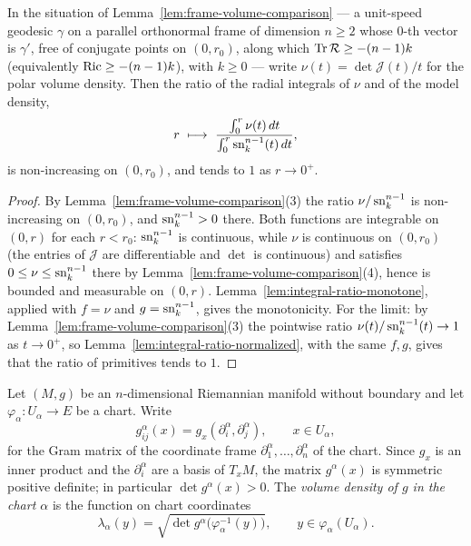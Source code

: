 \begin{lemma}
\label{lem:frame-bishop-gromov}





In the situation of Lemma~\ref{lem:frame-volume-comparison} --- a unit-speed
geodesic $\gamma$ on a parallel orthonormal frame of dimension $n\ge2$ whose
$0$-th vector is $\gamma'$, free of conjugate points on $(0,r_0)$, along which
$\operatorname{Tr}\mathcal R\ge-(n-1)k$ (equivalently $\operatorname{Ric}\ge-(n-1)k$), with $k\ge0$ ---
write $\nu(t)=\det\mathcal J(t)/t$ for the polar volume density. Then the ratio
of the radial integrals of $\nu$ and of the model density,
$$r\ \longmapsto\ \frac{\int_0^r\nu(t)\,dt}{\int_0^r\sn_k^{n-1}(t)\,dt},$$
is non-increasing on $(0,r_0)$, and tends to $1$ as $r\to0^+$.
\end{lemma}

\begin{proof}
\sketch
{}

By Lemma~\ref{lem:frame-volume-comparison}(3) the ratio $\nu/\operatorname{sn}_k^{n-1}$ is
non-increasing on $(0,r_0)$, and $\operatorname{sn}_k^{n-1}>0$ there. Both functions are
integrable on $(0,r)$ for each $r<r_0$: $\operatorname{sn}_k^{n-1}$ is continuous, while $\nu$
is continuous on $(0,r_0)$ (the entries of $\mathcal J$ are differentiable and
$\det$ is continuous) and satisfies $0\le\nu\le\operatorname{sn}_k^{n-1}$ there by
Lemma~\ref{lem:frame-volume-comparison}(4), hence is bounded and measurable on
$(0,r)$. Lemma~\ref{lem:integral-ratio-monotone}, applied with $f=\nu$ and
$g=\operatorname{sn}_k^{n-1}$, gives the monotonicity. For the limit: by
Lemma~\ref{lem:frame-volume-comparison}(3) the pointwise ratio
$\nu(t)/\operatorname{sn}_k^{n-1}(t)\to1$ as $t\to0^+$, so
Lemma~\ref{lem:integral-ratio-normalized}, with the same $f,g$, gives that the
ratio of primitives tends to $1$.
\end{proof}

\begin{definition}
\label{def:chart-volume-density}





Let $(M,g)$ be an $n$-dimensional Riemannian manifold without boundary and let
$\varphi_\alpha\colon U_\alpha\to E$ be a chart. Write
$$g^\alpha_{ij}(x)=g_x(\partial^\alpha_i,\partial^\alpha_j),\qquad x\in U_\alpha,$$
for the Gram matrix of the coordinate frame $\partial^\alpha_1,\dots,\partial^\alpha_n$
of the chart. Since $g_x$ is an inner product and the $\partial^\alpha_i$ are a basis of
$T_xM$, the matrix $g^\alpha(x)$ is symmetric positive definite; in particular
$\det g^\alpha(x)>0$. The \emph{volume density of $g$ in the chart $\alpha$} is the
function on chart coordinates
$$\lambda_\alpha(y)=\sqrt{\det g^\alpha\bigl(\varphi_\alpha^{-1}(y)\bigr)},
\qquad y\in\varphi_\alpha(U_\alpha).$$
\end{definition}

